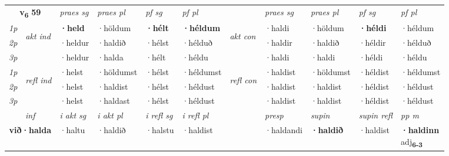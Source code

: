 \noindent
\begin{tabular}{lllllllllll} \toprule
\multicolumn{2}{c}{\textbf{v{\textsubscript{6}}} \Large{\textbf{59}}}  &  \textit{praes sg}  & \textit{praes pl}  &\textit{ pf sg} & \textit{pf pl} &  &  \textit{praes sg}  & \textit{praes pl}  & \textit{pf sg} & \textit{pf pl } \\*
	\cmidrule{3-6} \cmidrule{8-11}
 {\textit{1p}} & \multirow{3}{*}{\begin{turn}{90}\textit{akt ind}\end{turn}} & \textbf{·held} & ·höldum & \textbf{·hélt} & \textbf{·héldum} & \multirow{3}{*}{\begin{turn}{90}\textit{akt con}\end{turn}} &·haldi & ·höldum & \textbf{·héldi} & ·héldum\\*
 {\textit{2p}} &  &  ·heldur  & ·haldið & ·hélst & ·hélduð & & ·haldir & ·haldið & ·héldir & ·hélduð \\*
{\textit{3p}} &  & ·heldur & ·halda & ·hélt & ·héldu & & ·haldi & ·haldi& ·héldi & ·héldu \\*
\cmidrule{3-6} \cmidrule{8-11}
 {\textit{1p}} & \multirow{3}{*}{\begin{turn}{90}\textit{refl ind}\end{turn}}  & ·helst & ·höldumst & ·hélst & ·héldumst & \multirow{3}{*}{\begin{turn}{90}\textit{refl con}\end{turn}}  &·haldist & ·höldumst & ·héldist & ·héldumst \\*
 {\textit{2p}} &  & ·helst & ·haldist & ·hélst & ·héldust & &·haldist & ·haldist & ·héldist & ·héldust \\*
 {\textit{3p}}  & & ·helst & ·haldast & ·hélst & ·héldust & & ·haldist & ·haldist& ·héldist & ·héldust \\*
\cmidrule{3-6} \cmidrule{8-11}

   \multicolumn{2}{c}{\textit{inf}}  & \textit{i akt sg} & \textit{i akt pl} & \textit{i refl sg} & \textit{i refl pl} && \textit{presp} & \textit{supin} & \textit{supin refl} & \textit{pp m} \\*
  \multicolumn{2}{c}{\textbf{við\allowbreak ·halda}} & ·haltu  & ·haldið & ·halstu & ·haldist && ·haldandi &  \textbf{·haldið} & ·haldist & \specialcell{\textbf{·haldinn} \\ adj\textbf{\textsubscript{6-3}}} \\*
\end{tabular}

